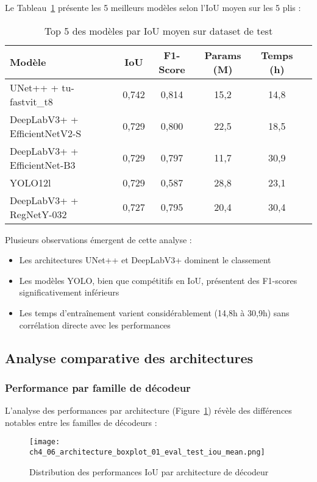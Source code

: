 Le Tableau~\ref{tab:top5_modeles} présente les 5 meilleurs modèles selon l'IoU moyen sur les 5 plis :

\begin{table}[htbp]
    \centering
    \caption{Top 5 des modèles par IoU moyen sur dataset de test}
    \begin{tabular}{lccccc}
        \toprule
        Modèle & IoU & F1-Score & Params (M) & Temps (h) \\
        \midrule
        UNet++ + tu-fastvit\_t8 & 0,742 & 0,814 & 15,2 & 14,8 \\
        DeepLabV3+ + EfficientNetV2-S & 0,729 & 0,800 & 22,5 & 18,5 \\
        DeepLabV3+ + EfficientNet-B3 & 0,729 & 0,797 & 11,7 & 30,9 \\
        YOLO12l & 0,729 & 0,587 & 28,8 & 23,1 \\
        DeepLabV3+ + RegNetY-032 & 0,727 & 0,795 & 20,4 & 30,4 \\
        \bottomrule
    \end{tabular}
    \label{tab:top5_modeles}
\end{table}

Plusieurs observations émergent de cette analyse :
\begin{itemize}
    \item Les architectures UNet++ et DeepLabV3+ dominent le classement
    \item Les modèles YOLO, bien que compétitifs en IoU, présentent des F1-scores significativement inférieurs
    \item Les temps d'entraînement varient considérablement (14,8h à 30,9h) sans corrélation directe avec les performances
\end{itemize}

\subsection{Analyse comparative des architectures}

\subsubsection{Performance par famille de décodeur}

L'analyse des performances par architecture (Figure~\ref{fig:boxplot_arch}) révèle des différences notables entre les familles de décodeurs :

\begin{figure}[htbp]
    \centering
    \texttt{[image: ch4\_06\_architecture\_boxplot\_01\_eval\_test\_iou\_mean.png]}
    \caption{Distribution des performances IoU par architecture de décodeur}
    \label{fig:boxplot_arch}
\end{figure}

